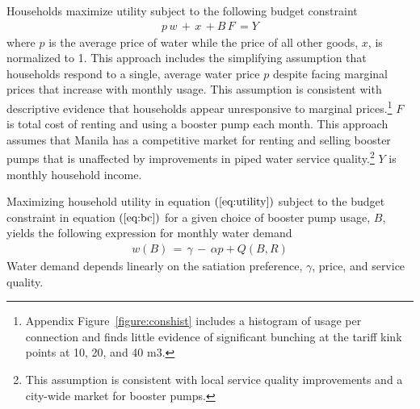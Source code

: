 \documentclass[12pt,table]{article}
\begin{document}

Households maximize utility subject to the following budget constraint
\begin{align}
\label{eq:bc}
p\,w \,+\, x \, +  B \, F \, = Y
\end{align}
where $p$ is the average price of water while the price of all other goods, $x$, is normalized to 1.  This approach includes the simplifying assumption that households respond to a single, average water price $p$ despite facing marginal prices that increase with monthly usage.  This assumption is consistent with descriptive evidence that households appear unresponsive to marginal prices.\footnote{Appendix Figure~\ref{figure:conshist} includes a histogram of usage per connection and finds little evidence of significant bunching at the tariff kink points at 10, 20, and 40 m3.}   $F$ is total cost of renting and using a booster pump each month.  This approach assumes that Manila has a competitive market for renting and selling booster pumps that is unaffected by improvements in piped water service quality.\footnote{This assumption is consistent with local service quality improvements and a city-wide market for booster pumps.}  $Y$ is monthly household income.  



Maximizing household utility in equation $(\ref{eq:utility})$ subject to the budget constraint in equation $(\ref{eq:bc})$ for a given choice of booster pump usage, $B$, yields the following expression for monthly water demand
\begin{align}
\label{eq:demand}
w(B) \, = \, \gamma \, - \, \alpha p +  Q(B,R)
\end{align}
Water demand depends linearly on the satiation preference, $\gamma$, price, and service quality.
\end{document}
